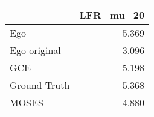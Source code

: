 \begin{tabular}{lr}
\toprule
{} & LFR_mu_20 \\
\midrule
Ego          &     5.369 \\
Ego-original &     3.096 \\
GCE          &     5.198 \\
Ground Truth &     5.368 \\
MOSES        &     4.880 \\
\bottomrule
\end{tabular}
